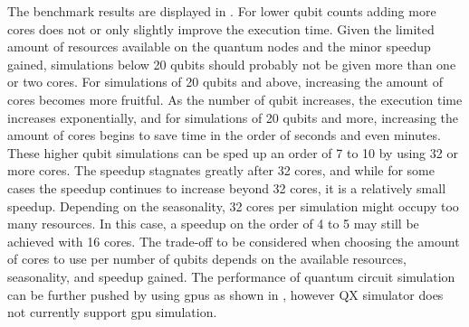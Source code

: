 The benchmark results are displayed in .
For lower qubit counts adding more cores does not or only slightly improve the execution time.
Given the limited amount of resources available on the quantum nodes and the minor speedup gained, simulations below 20 qubits should probably not be given more than one or two cores.
For simulations of 20 qubits and above, increasing the amount of cores becomes more fruitful.
As the number of qubit increases, the execution time increases exponentially, and for simulations of 20 qubits and more, increasing the amount of cores begins to save time in the order of seconds and even minutes.
These higher qubit simulations can be sped up an order of 7 to 10 by using 32 or more cores.
The speedup stagnates greatly after 32 cores, and while for some cases the speedup continues to increase beyond 32 cores, it is a relatively small speedup.
Depending on the seasonality, 32 cores per simulation might occupy too many resources.
In this case, a speedup on the order of 4 to 5 may still be achieved with 16 cores.
The trade-off to be considered when choosing the amount of cores to use per number of qubits depends on the available resources, seasonality, and speedup gained.
The performance of quantum circuit simulation can be further pushed by using \glspl{gpu} as shown in \cite[Appendix B]{oud2019simulation}, however QX simulator does not currently support \gls{gpu} simulation.

